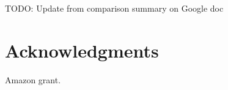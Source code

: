 \documentclass{article}
\newcommand{\todo}[2]{\color{red}TODO: #1\color{black}}
\begin{document}
\todo{Update from comparison summary on Google doc}


\section{Conclusion}

\section{Acknowledgments}

Amazon grant.



\end{document}
